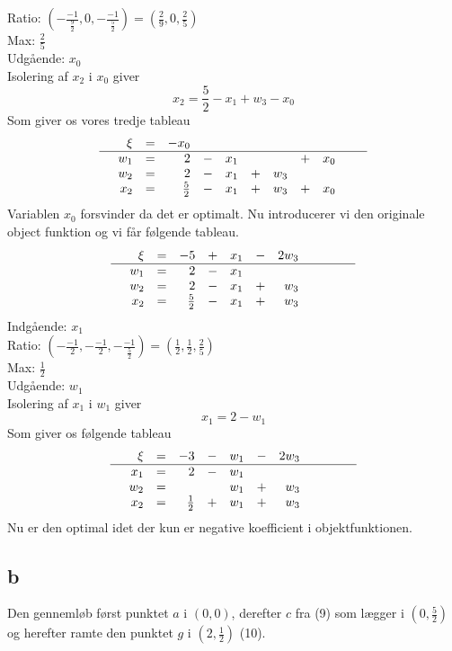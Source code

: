 \documentclass[a4paper]{article}
\begin{document}
Ratio: $(-\frac{-1}{\frac{9}{2}},0,-\frac{-1}{\frac{5}{2}})=(\frac{2}{9},0,\frac{2}{5})$ \\
Max: $\frac{2}{5}$ \\
Udgående: $x_0$ \\
Isolering af $x_2$ i $x_0$ giver
$$x_2=\frac{5}{2}-x_1+w_3-x_0$$
Som giver os vores tredje tableau
\begin{equation}
\begin{array}{rrrrrrrrrrrl}
&\xi &= &-x_0&&&&&\\
\hline
&w_1 &= &2&-&x_1&&&+&x_0&&\\
&w_2&=&2&-&x_1&+&w_3&&&& \\
&x_2&=&\frac{5}{2}&-&x_1&+&w_3&+&x_0&&
\end{array}
\end{equation}
Variablen $x_0$ forsvinder da det er optimalt. Nu introducerer vi den originale object funktion og vi får følgende tableau.
\begin{equation}
\begin{array}{rrrrrrrrrrrl}
&\xi &= &-5&+&x_1&-&2w_3&&&\\
\hline
&w_1 &= &2&-&x_1&&&&&&\\
&w_2&=&2&-&x_1&+&w_3&&&& \\
&x_2&=&\frac{5}{2}&-&x_1&+&w_3&&&&
\end{array}
\end{equation}
Indgående: $x_1$ \\
Ratio: $(-\frac{-1}{2},-\frac{-1}{2},-\frac{-1}{\frac{5}{2}})=(\frac{1}{2},\frac{1}{2},\frac{2}{5})$ \\
Max: $\frac{1}{2}$ \\
Udgående: $w_1$ \\
Isolering af $x_1$ i $w_1$ giver
$$x_1=2-w_1$$
Som giver os følgende tableau
\begin{equation}
\begin{array}{rrrrrrrrrrrl}
&\xi &= &-3&-&w_1&-&2w_3&&&\\
\hline
&x_1 &= &2&-&w_1&&&&&&\\
&w_2&=&&&w_1&+&w_3&&&& \\
&x_2&=&\frac{1}{2}&+&w_1&+&w_3&&&&
\end{array}
\end{equation}
Nu er den optimal idet der kun er negative koefficient i objektfunktionen.


\subsection*{b}
Den gennemløb først punktet $a$ i $(0,0)$, derefter $c$ fra (9) som lægger i $(0,\frac{5}{2})$ og herefter ramte den punktet $g$ i $(2,\frac{1}{2})$ (10).
\end{document}
